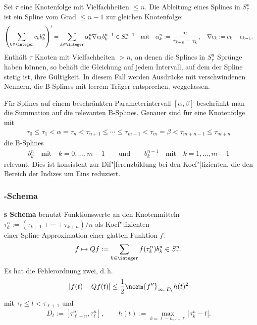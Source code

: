 Sei $\tau$ eine Knotenfolge mit Vielfachheiten $\le n$.
Die Ableitung eines Splines in $S_\tau^n$ ist ein Spline vom Grad $\le n - 1$
zur gleichen Knotenfolge:
\begin{align*}
    \left(\sum_{k \in \integer} c_k b_k^n\right)' =
    \sum_{k \in \integer} \alpha_k^n \nabla c_k b_k^{n-1} \in S_\tau^{n-1}
    \quad\text{mit}\quad
    \alpha_k^n := \frac{n}{\tau_{k+n} - \tau_k}, \quad
    \nabla c_k := c_k - c_{k-1}.
\end{align*}
Enthält $\tau$ Knoten mit Vielfachheiten $> n$, an denen die Splines in
$S_\tau^n$ Sprünge haben können, so behält die Gleichung auf jedem Intervall,
auf dem der Spline stetig ist, ihre Gültigkeit.
In diesem Fall werden Ausdrücke mit verschwindenen Nennern, die B-Splines mit
leerem Träger entsprechen, weggelassen.

\linie

Für Splines auf einem beschränkten Parameterintervall $[\alpha, \beta]$
beschränkt man die Summation auf die relevanten B-Splines.
Genauer sind für eine Knotenfolge mit
\begin{align*}
    \tau_0 \le \tau_1 < \alpha = \tau_n < \tau_{n+1} \le \dotsb \le
    \tau_{m-1} < \tau_m = \beta < \tau_{m+n-1} \le \tau_{m+n}
\end{align*}
die B-Splines
\begin{align*}
    b_k^n \quad\text{mit}\quad
    k = 0, \dotsc, m - 1 \qquad\text{und}\qquad
    b_k^{n-1} \quad\text{mit}\quad k = 1, \dotsc, m - 1
\end{align*}
relevant.
Dies ist konsistent zur Dif"|ferenzbildung bei den Koef"|fizienten, die den
Bereich der Indizes um Eins reduziert.

\subsubsection{%
    -Schema%
}

\textbf{s Schema} benutzt Funktionswerte an den
Knotenmitteln \\
$\tau_k^n := (\tau_{k+1} + \dotsb + \tau_{k+n})/n$ als Koef"|fizienten \\
einer Spline-Approximation einer glatten Funktion $f$:
\begin{align*}
    f \mapsto Qf := \sum_{k \in \integer} f(\tau_k^n) b_k^n \in S_\tau^n.
\end{align*}
Es hat die Fehlerordnung zwei, d.\,h.
\begin{align*}
    |f(t) - Qf(t)| \le \frac{1}{2} \norm{f''}_{\infty,\; D_t} h(t)^2
\end{align*}
mit $\tau_\ell \le t < \tau_{\ell+1}$ und
\begin{align*}
    D_t := [\tau_{\ell-n}^n, \tau_\ell^n], \qquad
    h(t) := \max_{k=\ell-n,\dotsc,\ell} |\tau_k^n - t|.
\end{align*}

